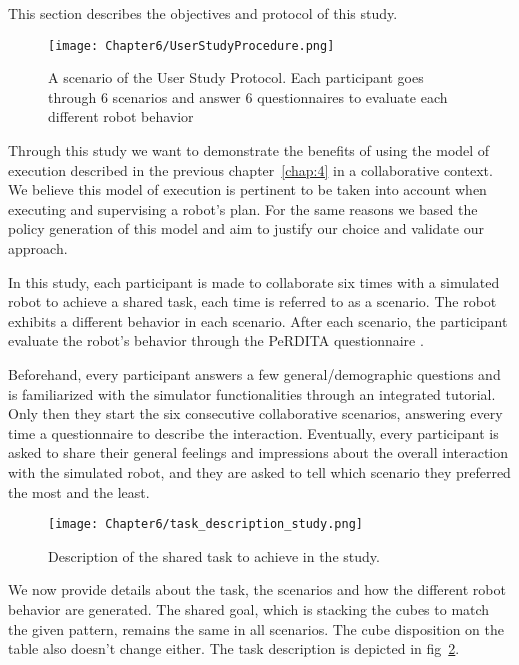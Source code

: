 This section describes the objectives and protocol of this study.  



\begin{figure}
    \centering
    \texttt{[image: Chapter6/UserStudyProcedure.png]}
    \caption{A scenario of the User Study Protocol. Each participant goes through 6 scenarios and answer 6 questionnaires to evaluate each different robot behavior}
    \label{fig:user_study_protocol}
\end{figure}




Through this study we want to demonstrate the benefits of using the model of execution described in the previous chapter~\ref{chap:4} in a collaborative context. We believe this model of execution is pertinent to be taken into account when executing and supervising a robot's plan. For the same reasons we based the policy generation of this model and aim to justify our choice and validate our approach.

In this study, each participant is made to collaborate six times with a simulated robot to achieve a shared task, each time is referred to as a scenario. The robot exhibits a different behavior in each scenario. After each scenario, the participant evaluate the robot's behavior through the PeRDITA questionnaire \cite{devin_evaluating_2018}.

Beforehand, every participant answers a few general/demographic questions and is familiarized with the simulator functionalities through an integrated tutorial. Only then they start the six consecutive collaborative scenarios, answering every time a questionnaire to describe the interaction. Eventually, every participant is asked to share their general feelings and impressions about the overall interaction with the simulated robot, and they are asked to tell which scenario they preferred the most and the least.

\begin{figure}
    \centering
    \texttt{[image: Chapter6/task\_description\_study.png]}
    \caption{Description of the shared task to achieve in the study.}
    \label{fig:task_description_study}
\end{figure}

We now provide details about the task, the scenarios and how the different robot behavior are generated. 
The shared goal, which is stacking the cubes to match the given pattern, remains the same in all scenarios. The cube disposition on the table also doesn't change either. The task description is depicted in fig~\ref{fig:task_description_study}. 

